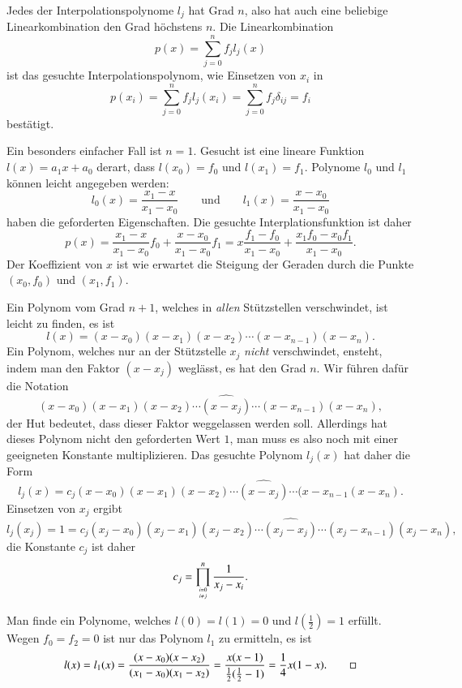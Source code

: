 Jedes der Interpolationspolynome $l_j$ hat Grad $n$, also hat auch eine
beliebige Linearkombination den Grad höchstens $n$.
Die Linearkombination
\[
p(x) = \sum_{j=0}^n f_j l_j(x)
\]
ist das gesuchte Interpolationspolynom, wie Einsetzen von $x_i$ in
\[
p(x_i)
=
\sum_{j=0}^n f_jl_j(x_i)
=
\sum_{j=0}^n f_j\delta_{ij}
=
f_i
\]
bestätigt.

\begin{beispiel}
Ein besonders einfacher Fall ist $n=1$.
Gesucht ist eine lineare Funktion $l(x)=a_1x+a_0$ derart, dass
$l(x_0)=f_0$ und $l(x_1)=f_1$.
Polynome $l_0$ und $l_1$ können leicht angegeben werden:
\[
l_0(x) = \frac{x_1-x}{x_1-x_0}
\qquad\text{und}\qquad
l_1(x) = \frac{x-x_0}{x_1-x_0}
\]
haben die geforderten Eigenschaften.
Die gesuchte Interplationsfunktion ist daher
\[
p(x)
=
\frac{x_1-x}{x_1-x_0}f_0 + \frac{x-x_0}{x_1-x_0} f_1
=
x \frac{f_1-f_0}{x_1-x_0}   + \frac{x_1f_0-x_0f_1}{x_1-x_0}.
\]
Der Koeffizient von $x$ ist wie erwartet die Steigung der Geraden durch
die Punkte $(x_0,f_0)$ und $(x_1,f_1)$.
\end{beispiel}

Ein Polynom vom Grad $n+1$, welches in {\em allen} Stützstellen verschwindet,
ist leicht zu finden, es ist 
\[
l(x)
=
(x-x_0)(x-x_1)(x-x_2)\cdots (x-x_{n-1})(x-x_n).
\]
Ein Polynom, welches nur an der Stützstelle $x_j$ {\em nicht} verschwindet,
ensteht, indem man den Faktor $(x-x_j)$ weglässt, es hat den Grad $n$.
Wir führen dafür die Notation
\[
(x-x_0)(x-x_1)(x-x_2)\cdots \widehat{(x-x_j)}\cdots (x-x_{n-1})(x-x_n),
\]
der Hut bedeutet, dass dieser Faktor weggelassen werden soll.
Allerdings hat dieses Polynom nicht den geforderten Wert $1$, man muss es
also noch mit einer geeigneten Konstante multiplizieren.
Das gesuchte Polynom $l_j(x)$ hat daher die Form
\[
l_j(x)
=
c_j(x-x_0)(x-x_1)(x-x_2)\cdots \widehat{(x-x_j)}\cdots (x-x_{n-1}(x-x_n).
\]
Einsetzen von $x_j$ ergibt
\[
l_j(x_j) = 1 = 
c_j(x_j-x_0)(x_j-x_1)(x_j-x_2)\cdots \widehat{(x_j-x_j)}\cdots(x_j-x_{n-1})(x_j-x_n),
\]
die Konstante $c_j$ ist daher
\[
c_j = \prod_{i=0\atop i\ne j}^n \frac{1}{x_j-x_i}.
\]

\begin{beispiel}
Man finde ein Polynome, welches $l(0)=l(1)=0$ und $l(\frac12)=1$
erfüllt.
Wegen $f_0=f_2=0$ ist nur das Polynom $l_1$ zu ermitteln, es ist
\[
l(x) = l_1(x)
=
\frac{(x-x_0)(x-x_2)}{(x_1-x_0)(x_1-x_2)}
=
\frac{x(x-1)}{\frac12(\frac12-1)}
=
\frac14x(1-x).
\qedhere
\]
\end{beispiel}

%
%

